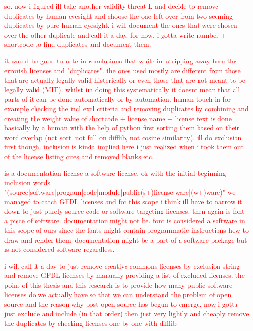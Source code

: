 \textcolor{red}{so. now i figured ill take another validity threat L and decide to remove duplicates by human eyesight and choose the one left over from two seeming duplicates by pure human eyesight. i will document the ones that were chosen over the other duplicate and call it a day. for now. i gotta write number + shortcode to find duplicates and document them.}

\textcolor{red}{it would be good to note in conclusions that while im stripping away here the errorish licenses and "duplicates". the ones used mostly are different from those that are actually legally valid historically or even those that are not meant to be legally valid (MIT). whilst im doing this systematically it doesnt mean that all parts of it can be done automatically or by automation. human touch in for example checking the incl excl criteria and removing duplicates by combining and creating the weight value of shortcode + license name + license text is done basically by a human with the help of python first sorting them based on their word overlap (not sort, not full on difflib, not cosine similarity). ill do exclusion first though. inclusion is kinda implied here i just realized when i took them out of the license listing cites and removed blanks etc.}

\textcolor{red}{is a documentation license a software license. ok with the initial beginning inclusion words \\"(source|software|program|code|module|public(s+)license|ware|(w+)ware)" we managed to catch GFDL licenses and for this scope i think ill have to narrow it down to just purely source code or software targeting licenses. then again is font a piece of software. documentation might not be. font is considered a software in this scope of ours since the fonts might contain programmatic instructions how to draw and render them. documentation might be a part of a software package but is not considered software regardless.}

\textcolor{red}{i will call it a day to just remove creative commons licenses by exclusion string and remove GFDL licenses by manually providing a list of excluded licenses. the point of this thesis and this research is to provide how many public software licenses do we actually have so that we can understand the problem of open source and the reason why post-open source has begun to emerge. now i gotta just exclude and include (in that order) then just very lightly and cheaply remove the duplicates by checking licenses one by one with difflib}

